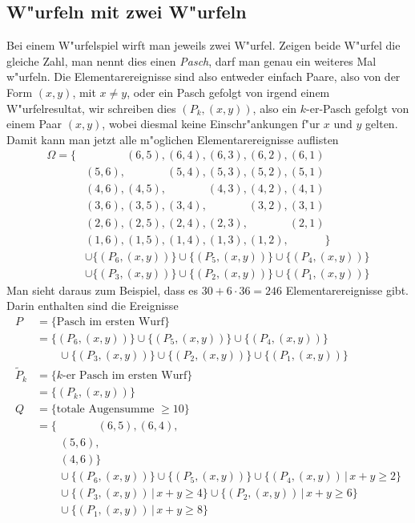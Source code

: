 \subsection{W"urfeln mit zwei W"urfeln}
Bei einem W"urfelspiel wirft man jeweils zwei W"urfel.
Zeigen beide W"urfel
die gleiche Zahl, man nennt dies einen {\em Pasch}, darf man genau ein
weiteres Mal w"urfeln.
Die Elementarereignisse sind also entweder einfach Paare, also von
der Form $(x,y)$, mit $x\ne y$, oder ein Pasch gefolgt von irgend einem
W"urfelresultat, wir schreiben dies $(P_k, (x,y))$, also ein $k$-er-Pasch
gefolgt von einem Paar $(x,y)$, wobei diesmal keine Einschr"ankungen f"ur
$x$ und $y$ gelten.
Damit kann man jetzt alle m"oglichen Elementarereignisse auflisten
\begin{align*}
\Omega=\{
&\phantom{(6,6),} (6,5), (6,4), (6,3), (6,2), (6,1)\\
&(5,6), \phantom{(5,5),} (5,4), (5,3), (5,2), (5,1)\\
&(4,6), (4,5), \phantom{(4,4),} (4,3), (4,2), (4,1)\\
&(3,6), (3,5), (3,4), \phantom{(3,3),} (3,2), (3,1)\\
&(2,6), (2,5), (2,4), (2,3), \phantom{(2,2),} (2,1)\\
&(1,6), (1,5), (1,4), (1,3), (1,2), \phantom{(1,1)}
\}
\\
&\cup
\{(P_6,(x,y))\}
\cup
\{(P_5,(x,y))\}
\cup
\{(P_4,(x,y))\}
\\
&\cup
\{(P_3,(x,y))\}
\cup
\{(P_2,(x,y))\}
\cup
\{(P_1,(x,y))\}
\end{align*}
Man sieht daraus zum Beispiel, dass es $30 + 6\cdot 36=246$
Elementarereignisse gibt.
Darin enthalten sind die Ereignisse
\begin{align*}
P&=\{\text{Pasch im ersten Wurf}\}\\
&=
\{(P_6,(x,y))\}
\cup
\{(P_5,(x,y))\}
\cup
\{(P_4,(x,y))\}
\\
&\qquad \cup
\{(P_3,(x,y))\}
\cup
\{(P_2,(x,y))\}
\cup
\{(P_1,(x,y))\}
\\
\tilde P_k&=\{\text{$k$-er Pasch im ersten Wurf}\}\\
   &=\{(P_k,(x,y))\}
\\
Q&=\{\text{totale Augensumme $\ge 10$}\}\\
&=\{\phantom{(6,6),} (6,5), (6,4), \\
&\phantom{\;=\{}(5,6), \phantom{(5,5),} \\
&\phantom{\;=\{}(4,6)
\}
\\
&\qquad\cup
\{(P_6,(x,y))\}
\cup
\{(P_5,(x,y))\}
\cup
\{(P_4,(x,y))\,|\, x+y \ge 2\}
\\
&\qquad\cup
\{(P_3,(x,y))\,|\, x+y \ge 4\}
\cup
\{(P_2,(x,y))\,|\, x+y \ge 6\}
\\
&\qquad
\cup
\{(P_1,(x,y))\,|\, x+y \ge 8\}
\end{align*}

